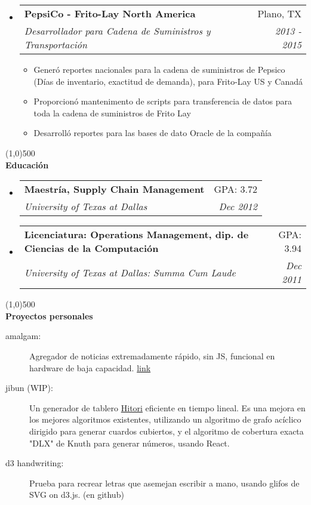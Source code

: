 \documentclass[letterpaper,11pt]{article}
\makeatletter
\newcommand{\resitem}[1]{\item #1 \vspace{-3pt}}
\newcommand{\resheading}[1]{{\large {\textbf{#1 \vphantom{p\^{E}}}}}}
\newcommand{\addline}{\line(1,0){500}}
\newcommand{\ressubheading}[4]{
	\begin{tabular*}{6.5in}{l@{\extracolsep{\fill}}r}
			\textbf{#1} & #2 \\
			\textit{#3} & \textit{#4} \\
	\end{tabular*}\vspace{-6pt}}
\makeatother
\begin{document}
\begin{itemize}
\item
	\ressubheading{PepsiCo - Frito-Lay North America}{Plano, TX}{Desarrollador para Cadena de Suministros y Transportación}{2013 - 2015}
	\begin{itemize}
		\resitem{Generó reportes nacionales para la cadena de suministros de Pepsico (Días de inventario, exactitud de demanda), para Frito-Lay US y Canadá}
		\resitem{Proporcionó mantenimento de scripts para transferencia de datos para toda la cadena de suministros de Frito Lay}
		\resitem{Desarrolló reportes para las bases de dato Oracle de la compañía}
	\end{itemize}



\end{itemize}
\addline
\\
\resheading{Educación}
\begin{itemize}
\item
	\ressubheading{Maestría, Supply Chain Management}{GPA: 3.72}
{University of Texas at Dallas}{Dec 2012}

\item
	\ressubheading{Licenciatura: Operations Management, dip. de Ciencias de la Computación}
		{GPA: 3.94}{University of Texas at Dallas: Summa Cum Laude}{Dec 2011}
\end{itemize}

\pagebreak
\addline
\\
\resheading{Proyectos personales}
\begin{description}
	\item [amalgam:] Agregador de noticias extremadamente rápido, sin JS, funcional en hardware de baja capacidad. \href{http://links.maxalcala.com}{link}
	
	\item [jibun (WIP):] Un generador de tablero \href{https://en.wikipedia.org/wiki/Hitori}{Hitori} eficiente en tiempo lineal. Es una mejora en los mejores algoritmos existentes, utilizando un algoritmo de grafo acíclico dirigido para generar cuardos cubiertos, y el algoritmo de cobertura exacta "DLX" de Knuth para generar números, usando React.

  \item [d3 handwriting:] Prueba para recrear letras que asemejan escribir a mano, usando glifos de SVG on d3.js. (en github)
\end{description}
\end{document}
